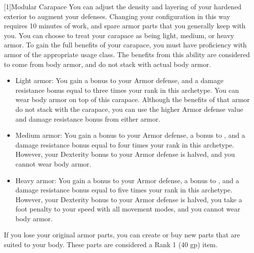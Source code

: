     [1]{Modular Carapace} You can adjust the density and layering of your hardened exterior to augment your defenses.
      Changing your configuration in this way requires 10 minutes of work, and spare armor parts that you generally keep with you.
      You can choose to treat your carapace as being light, medium, or heavy armor.
      To gain the full benefits of your carapace, you must have proficiency with armor of the appropriate usage class.
      The benefits from this ability are considered to come from body armor, and do not stack with actual body armor.

      \begin{itemize}
        \item Light armor: You gain a  bonus to your Armor defense, and a damage resistance bonus equal to three times your rank in this archetype.
          You can wear body armor on top of this carapace.
          Although the benefits of that armor do not stack with the carapace, you can use the higher Armor defense value and damage resistance bonus from either armor.
        \item Medium armor: You gain a  bonus to your Armor defense, a  bonus to , and a damage resistance bonus equal to four times your rank in this archetype.
          However, your Dexterity bonus to your Armor defense is halved, and you cannot wear body armor.
        \item Heavy armor: You gain a  bonus to your Armor defense, a  bonus to , and a damage resistance bonus equal to five times your rank in this archetype.
          However, your Dexterity bonus to your Armor defense is halved, you take a  foot penalty to your speed with all movement modes, and you cannot wear body armor.
      \end{itemize}

      If you lose your original armor parts, you can create or buy new parts that are suited to your body.
      These parts are considered a Rank 1 (40 gp) item.

